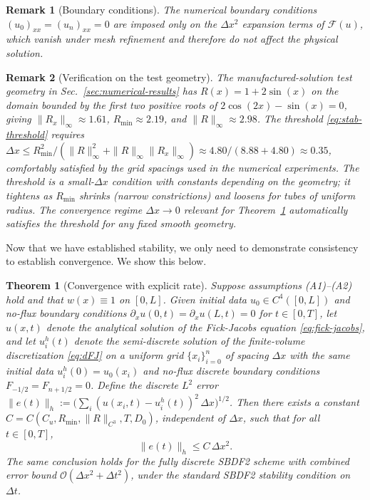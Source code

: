 \documentclass[11pt]{article}
\newtheorem{remark}{Remark}
\newtheorem{theorem}{Theorem}
\begin{document}
\begin{remark}[Boundary conditions]
    The numerical boundary conditions $(u_0)_{xx} = (u_n)_{xx} = 0$ are imposed only on the $\Delta x^2$ expansion terms of $\mathcal{F}(u)$, which vanish under mesh refinement and therefore do not affect the physical solution.
\end{remark}

\begin{remark}[Verification on the test geometry]
    The manufactured-solution test geometry in Sec.~\ref{sec:numerical-results} has $R(x) = 1 + 2\sin(x)$ on the domain bounded by the first two positive roots of $2\cos(2x) - \sin(x) = 0$, giving $\|R_x\|_\infty \approx 1.61$, $R_{\min} \approx 2.19$, and $\|R\|_\infty \approx 2.98$. The threshold \eqref{eq:stab-threshold} requires $\Delta x \leq R_{\min}^2/(\|R\|_\infty^2 + \|R\|_\infty\|R_x\|_\infty) \approx 4.80/(8.88 + 4.80) \approx 0.35$, comfortably satisfied by the grid spacings used in the numerical experiments. The threshold is a small-$\Delta x$ condition with constants depending on the geometry; it tightens as $R_{\min}$ shrinks (narrow constrictions) and loosens for tubes of uniform radius. The convergence regime $\Delta x \to 0$ relevant for Theorem~\ref{thm:convergence} automatically satisfies the threshold for any fixed smooth geometry.
\end{remark}


Now that we have established stability, we only need to demonstrate consistency to establish convergence. We show this below.

\begin{theorem}[Convergence with explicit rate]\label{thm:convergence}
Suppose assumptions (A1)--(A2) hold and that $w(x) \equiv 1$ on $[0, L]$. Given initial data $u_0 \in C^4([0, L])$ and no-flux boundary conditions $\partial_x u(0, t) = \partial_x u(L, t) = 0$ for $t \in [0, T]$, let $u(x, t)$ denote the analytical solution of the Fick-Jacobs equation \eqref{eq:fick-jacobs}, and let $u^h_i(t)$ denote the semi-discrete solution of the finite-volume discretization \eqref{eq:dFJ} on a uniform grid $\{x_i\}_{i=0}^n$ of spacing $\Delta x$ with the same initial data $u^h_i(0) = u_0(x_i)$ and no-flux discrete boundary conditions $F_{-1/2} = F_{n+1/2} = 0$. Define the discrete $L^2$ error $\|e(t)\|_h := \big( \sum_i (u(x_i, t) - u^h_i(t))^2 \, \Delta x \big)^{1/2}$. Then there exists a constant $C = C(C_u, R_{\min}, \|R\|_{C^3}, T, D_0)$, independent of $\Delta x$, such that for all $t \in [0, T]$,
    \begin{equation}
        \|e(t)\|_h \leq C \, \Delta x^2. \label{eq:convergence-rate}
    \end{equation}
    The same conclusion holds for the fully discrete SBDF2 scheme with combined error bound $\mathcal{O}(\Delta x^2 + \Delta t^2)$, under the standard SBDF2 stability condition on $\Delta t$.
\end{theorem}
\end{document}
